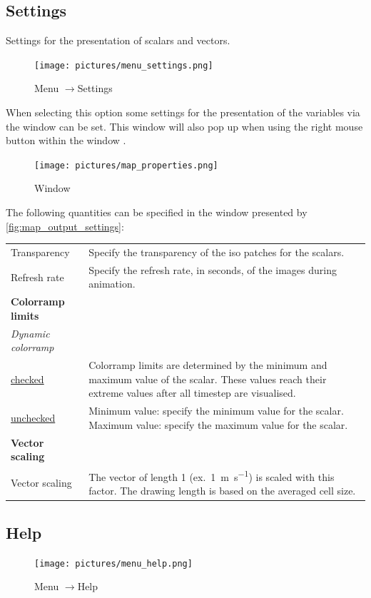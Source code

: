 \documentclass{deltares_memo}
\newcommand{\menuarrow}{$\rightarrow$}
\begin{document}
\subsection{Settings}
Settings for the presentation of scalars and vectors.
\begin{figure}[H]
    \centering    
    \texttt{[image: pictures/menu\_settings.png]}
    \caption{Menu \menuarrow Settings}
\end{figure}
When selecting this option some settings for the presentation of the variables via the window  can be set. 
This window will also pop up when using the right mouse button within the window .
\begin{figure}[H]
	\centering    
	\texttt{[image: pictures/map\_properties.png]}
	\caption{Window \label{fig:map_output_settings}}
\end{figure}
The following quantities can be specified in the window presented by \autoref{fig:map_output_settings}:
\begin{longtable}{p{35mm-12pt} p{\textwidth-35mm-12pt}} 
	Transparency & Specify the transparency of the iso patches for the scalars. \\
	Refresh rate & Specify the refresh rate, in seconds, of the images during animation. \\	
	\textbf{Colorramp limits} & \\
	\textsl{Dynamic colorramp} & \\
	\underline{checked} & Colorramp limits are determined by the minimum and maximum value of the scalar. 
	These values reach their extreme values after all timestep are visualised.\\
	\underline{unchecked} & 
	Minimum value: \quad specify the minimum value for the scalar.\newline
	Maximum value: \quad specify the maximum value for the scalar.\\
	\textbf{Vector scaling} & \\
	Vector scaling & The vector of length 1 (ex.\ \SI{1}{\metre\per\second}) is scaled with this factor. The drawing length is based on the averaged cell size.
\end{longtable}
\subsection{Help}
\phantom{m}\vspace{-\baselineskip}
\begin{figure}[H]
    \centering    
    \texttt{[image: pictures/menu\_help.png]}
    \caption{Menu \menuarrow Help}
\end{figure}
\end{document}
